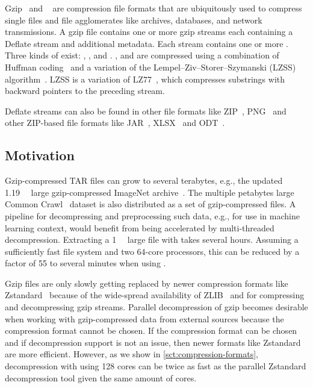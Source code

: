
Gzip~\cite{RFC1952} and ~\cite{RFC1951} are compression file formats that are ubiquitously used to compress single files and file agglomerates like \tar archives, databases, and network transmissions.
A gzip file contains one or more gzip streams each containing a Deflate stream and additional metadata.
Each  stream contains one or more .
Three kinds of  exist: \rawblocks, \dynblocks, and \fixedblocks.
\dynblocks, and \fixedblocks are compressed using a combination of Huffman coding~\cite{huffman} and a variation of the Lempel–Ziv–Storer–Szymanski (LZSS) algorithm~\cite{lzss}.
LZSS is a variation of LZ77~\cite{lz77}, which compresses substrings with backward pointers to the preceding stream.

Deflate streams can also be found in other file formats like ZIP~\cite{zip}, PNG~\cite{png} and other ZIP-based file formats like JAR~\cite{jar}, XLSX~\cite{xlsx} and ODT~\cite{odt}.


\subsection{Motivation}

Gzip-compressed TAR files can grow to several terabytes, e.g., the updated \SI{1.19}{\tera\byte} large gzip-compressed ImageNet archive~\cite{imagenet21k}.
The multiple petabytes large Common Crawl~\cite{commoncrawl} dataset is also distributed as a set of gzip-compressed files.
A pipeline for decompressing and preprocessing such data, e.g., for use in machine learning context, would benefit from being accelerated by multi-threaded decompression.
Extracting a \SI{1}{\tera\byte} large file with \gzip takes several hours.
Assuming a sufficiently fast file system and two 64-core processors, this can be reduced by a factor of \num{55} to several minutes when using \pragzipname.

Gzip files are only slowly getting replaced by newer compression formats like Zstandard~\cite{zstandard} because of the wide-spread availability of ZLIB~\cite{zlib} and \gzip for compressing and decompressing gzip streams.
Parallel decompression of gzip becomes desirable when working with gzip-compressed data from external sources because the compression format cannot be chosen.
If the compression format can be chosen and if decompression support is not an issue, then newer formats like Zstandard are more efficient.
However, as we show in \cref{sct:compression-formats}, decompression with \pragzipname using 128 cores can be twice as fast as the parallel Zstandard decompression tool \pzstd given the same amount of cores.



